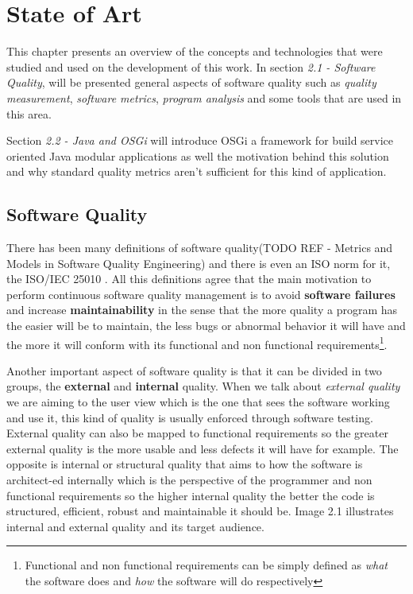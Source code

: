\chapter{State of Art}
This chapter presents an overview of the concepts and technologies that were studied and used on the development of this work. 
In section \textit{2.1 - Software Quality}, will be presented general aspects of software quality such as \textit{quality measurement},  \textit{software metrics}, \textit{program analysis} and some tools that are used in this area.  

Section \textit{2.2 - Java and OSGi} will introduce OSGi a framework for build service oriented Java modular applications as well the motivation 
behind this solution and why standard quality metrics aren't sufficient for this kind of application. 


\section{Software Quality}

There has been many definitions of software quality(TODO REF - Metrics and Models in Software Quality Engineering) and there is even an ISO norm for it, the ISO/IEC 25010 \citep{iso 2011}. All this definitions agree that the main motivation to perform continuous software quality management is to avoid \textbf{software failures} and increase \textbf{maintainability} in the sense that the more quality a program has the easier will be to maintain, the less bugs or abnormal behavior it will have and the more it will conform with its functional and non functional requirements\footnote{Functional and non functional requirements can be simply defined as \textit{what} the software does and \textit{how} the software will do respectively}. 

Another important aspect of software quality is that it can be divided in two groups, the \textbf{external} and \textbf{internal} quality. When we talk about \textit{external quality} we are aiming to the user view which is the one that sees the software working and use it, this kind of quality is usually enforced through software testing. External quality can also be mapped to functional requirements so the greater external quality is the more usable and less defects it will have for example. The opposite is internal or structural quality that aims to how the software is architect-ed internally which is the perspective of the programmer and non functional requirements so the higher internal quality the better the code is structured, efficient, robust and maintainable it should be. Image 2.1 illustrates internal and external quality and its target audience.


